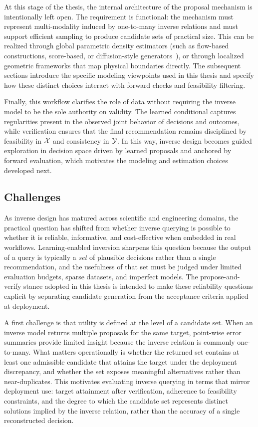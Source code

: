 At this stage of the thesis, the internal architecture of the proposal mechanism is intentionally left open. The requirement is functional: the mechanism must represent multi-modality induced by one-to-many inverse relations and must support efficient sampling to produce candidate sets of practical size. This can be realized through global parametric density estimators (such as flow-based constructions, score-based, or diffusion-style generators~\cite{Papamakarios2021}), or through localized geometric frameworks that map physical boundaries directly. The subsequent sections introduce the specific modeling viewpoints used in this thesis and specify how these distinct choices interact with forward checks and feasibility filtering.

Finally, this workflow clarifies the role of data without requiring the inverse model to be the sole authority on validity. The learned conditional captures regularities present in the observed joint behavior of decisions and outcomes, while verification ensures that the final recommendation remains disciplined by feasibility in $\mathcal{X}$ and consistency in $\mathcal{Y}$. In this way, inverse design becomes guided exploration in decision space driven by learned proposals and anchored by forward evaluation, which motivates the modeling and estimation choices developed next.


\subsection{Challenges}\label{sec:inverse_challenges}

As inverse design has matured across scientific and engineering domains, the practical question has shifted from whether inverse querying is possible to whether it is reliable, informative, and cost-effective when embedded in real workflows. Learning-enabled inversion sharpens this question because the output of a query is typically a \emph{set} of plausible decisions rather than a single recommendation, and the usefulness of that set must be judged under limited evaluation budgets, sparse datasets, and imperfect models. The propose-and-verify stance adopted in this thesis is intended to make these reliability questions explicit by separating candidate generation from the acceptance criteria applied at deployment.

A first challenge is that utility is defined at the level of a candidate set. When an inverse model returns multiple proposals for the same target, point-wise error summaries provide limited insight because the inverse relation is commonly one-to-many. What matters operationally is whether the returned set contains at least one admissible candidate that attains the target under the deployment discrepancy, and whether the set exposes meaningful alternatives rather than near-duplicates. This motivates evaluating inverse querying in terms that mirror deployment use: target attainment after verification, adherence to feasibility constraints, and the degree to which the candidate set represents distinct solutions implied by the inverse relation, rather than the accuracy of a single reconstructed decision.

